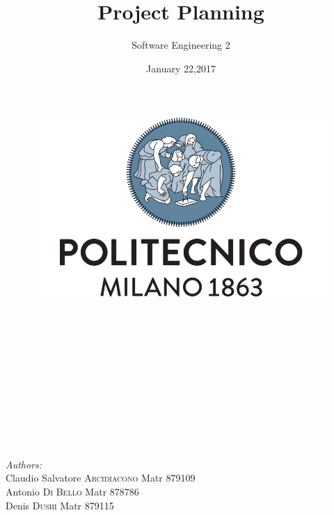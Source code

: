 \documentclass[a4paper]{article}
\title{Project Planning}
\author{Software Engineering 2}
\date{January 22,2017}
\begin{document}
\maketitle

\begin{figure}[h]
  \centering
  \includegraphics[width=300 pt]{resources/polimi.png}
  \label{fig:polimi}
\end{figure}

\emph{\\}
\emph{\\}
\emph{\\}
\emph{\\}
\emph{\\}
\emph{\\}
\emph{\\}
\emph{\\}
\emph{\\}
\emph{\\}

\begin{minipage}{0.7\textwidth}
\begin{flushleft} \large
\emph{Authors:}\\
Claudio Salvatore \textsc{Arcidiacono} Matr 879109\\
Antonio \emph{ }\emph{ }\emph{ }\emph{ }\emph{ }\emph{ }\emph{ }\emph{ }\emph{ }\emph{ }\emph{ }\emph{ }\textsc{Di Bello} \emph{ }\emph{ }\emph{ }\emph{ } Matr 878786\\
Denis  \emph{ }\emph{ }\emph{ }\emph{ }\emph{ }\emph{ }\emph{ }\emph{ }\emph{ }\emph{ }\emph{ }\emph{ }\emph{ }\emph{ }\emph{ }\textsc{Dushi } \emph{ }\emph{ }\emph{ }\emph{ }\emph{ }\emph{ }\emph{ }\emph{ }\emph{ }Matr 879115
\end{flushleft}
\end{minipage}

\begin{minipage}{0.4\textwidth}

\end{minipage}
\end{document}
